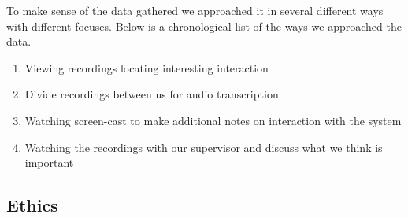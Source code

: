 To make sense of the data gathered we approached it in several different ways with different focuses. Below is a chronological list of the ways we approached the data. 

\begin{enumerate}
\item{Viewing recordings locating interesting interaction}
\item{Divide recordings between us for audio transcription}
\item{Watching screen-cast to make additional notes on interaction with the system}
\item{Watching the recordings with our supervisor and discuss what we think is important}
\end{enumerate}

\subsection{Ethics}



